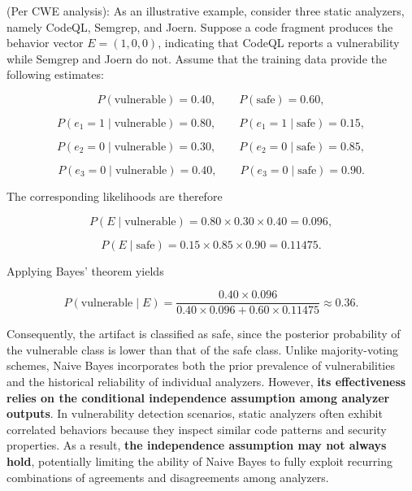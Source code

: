 \documentclass{article}
\begin{document}
(Per CWE analysis): As an illustrative example, consider three static analyzers, namely CodeQL, Semgrep, and Joern.
Suppose a code fragment produces the behavior vector $E=(1,0,0)$, indicating that CodeQL reports a vulnerability while Semgrep and Joern do not.
Assume that the training data provide the following estimates:

\begin{equation}
P(\text{vulnerable}) = 0.40,
\qquad
P(\text{safe}) = 0.60,
\end{equation}

\begin{equation}
P(e_1=1 \mid \text{vulnerable}) = 0.80,
\qquad
P(e_1=1 \mid \text{safe}) = 0.15,
\end{equation}

\begin{equation}
P(e_2=0 \mid \text{vulnerable}) = 0.30,
\qquad
P(e_2=0 \mid \text{safe}) = 0.85,
\end{equation}

\begin{equation}
P(e_3=0 \mid \text{vulnerable}) = 0.40,
\qquad
P(e_3=0 \mid \text{safe}) = 0.90.
\end{equation}

The corresponding likelihoods are therefore

\begin{equation}
P(E \mid \text{vulnerable})
=
0.80 \times 0.30 \times 0.40
=
0.096,
\end{equation}

\begin{equation}
P(E \mid \text{safe})
=
0.15 \times 0.85 \times 0.90
=
0.11475.
\end{equation}

Applying Bayes' theorem yields

\begin{equation}
P(\text{vulnerable} \mid E)
=
\frac{0.40 \times 0.096}
{0.40 \times 0.096 + 0.60 \times 0.11475}
\approx
0.36.
\end{equation}

Consequently, the artifact is classified as safe, since the posterior probability of the vulnerable class is lower than that of the safe class.
Unlike majority-voting schemes, Naive Bayes incorporates both the prior prevalence of vulnerabilities and the historical reliability of individual analyzers.
However, \textbf{its effectiveness relies on the conditional independence assumption among analyzer outputs}.
In vulnerability detection scenarios, static analyzers often exhibit correlated behaviors because they inspect similar code patterns and security properties.
As a result, \textbf{the independence assumption may not always hold}, potentially limiting the ability of Naive Bayes to fully exploit recurring combinations of agreements and disagreements among analyzers.
\end{document}
